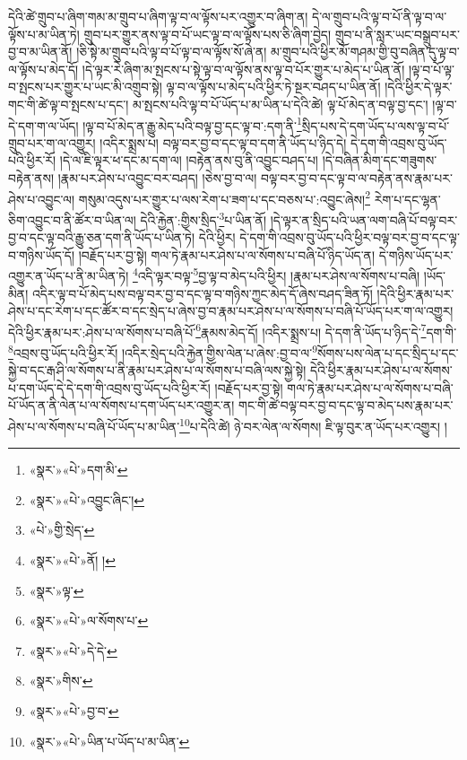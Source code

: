 དེའི་ཚེ་གྲུབ་པ་ཞིག་གམ་མ་གྲུབ་པ་ཞིག་ལྟ་བ་ལ་ལྟོས་པར་འགྱུར་བ་ཞིག་ན། དེ་ལ་གྲུབ་པའི་ལྟ་བ་པོ་ནི་ལྟ་བ་ལ་ལྟོས་པ་མ་ཡིན་ཏེ། གྲུབ་པར་གྱུར་ནས་ལྟ་བ་པོ་ཡང་ལྟ་བ་ལ་ལྟོས་པས་ཅི་ཞིག་བྱེད། གྲུབ་པ་ནི་སླར་ཡང་བསྒྲུབ་པར་བྱ་བ་མ་ཡིན་ནོ། །ཅི་སྟེ་མ་གྲུབ་པའི་ལྟ་བ་པོ་ལྟ་བ་ལ་ལྟོས་སོ་ཞེ་ན། མ་གྲུབ་པའི་ཕྱིར་མོ་གཤམ་གྱི་བུ་བཞིན་དུ་ལྟ་བ་ལ་ལྟོས་པ་མེད་དོ། །དེ་ལྟར་རེ་ཞིག་མ་སྤངས་པ་སྟེ་ལྟ་བ་ལ་ལྟོས་ནས་ལྟ་བ་པོར་གྱུར་པ་མེད་པ་ཡིན་ནོ། །ལྟ་བ་པོ་ལྟ་བ་སྤངས་པར་གྱུར་པ་ཡང་མི་འགྲུབ་སྟེ། ལྟ་བ་ལ་ལྟོས་པ་མེད་པའི་ཕྱིར་ཏེ་སྔར་བཤད་པ་ཡིན་ནོ། །དེའི་ཕྱིར་དེ་ལྟར་གང་གི་ཚེ་ལྟ་བ་སྤངས་པ་དང་། མ་སྤངས་པའི་ལྟ་བ་པོ་ཡོད་པ་མ་ཡིན་པ་དེའི་ཚེ། ལྟ་པོ་མེད་ན་བལྟ་བྱ་དང་། །ལྟ་བ་དེ་དག་ག་ལ་ཡོད། །ལྟ་བ་པོ་མེད་ན་རྒྱུ་མེད་པའི་བལྟ་བྱ་དང་ལྟ་བ་:དག་ནི་\footnote{«སྣར་»«པེ་»དག་མི་}སྲིད་པས་དེ་དག་ཡོད་པ་ལས་ལྟ་བ་པོ་གྲུབ་པར་ག་ལ་འགྱུར། །འདིར་སྨྲས་པ། བལྟ་བར་བྱ་བ་དང་ལྟ་བ་དག་ནི་ཡོད་པ་ཉིད་དེ། དེ་དག་གི་འབྲས་བུ་ཡོད་པའི་ཕྱིར་རོ། །དེ་ལ་ཇི་ལྟར་ཕ་དང་མ་དག་ལ། །བརྟེན་ནས་བུ་ནི་འབྱུང་བཤད་པ། །དེ་བཞིན་མིག་དང་གཟུགས་བརྟེན་ནས། །རྣམ་པར་ཤེས་པ་འབྱུང་བར་བཤད། །ཅེས་བྱ་བ་ལ། བལྟ་བར་བྱ་བ་དང་ལྟ་བ་ལ་བརྟེན་ནས་རྣམ་པར་ཤེས་པ་འབྱུང་ལ། གསུམ་འདུས་པར་གྱུར་པ་ལས་རེག་པ་ཟག་པ་དང་བཅས་པ་:འབྱུང་ཞེས།\footnote{«སྣར་»«པེ་»འབྱུང་ཞིང་།} རེག་པ་དང་ལྷན་ཅིག་འབྱུང་བ་ནི་ཚོར་བ་ཡིན་ལ། དེའི་རྐྱེན་:གྱིས་སྲིད་\footnote{«པེ་»གྱི་སྲེད་}པ་ཡིན་ནོ། །དེ་ལྟར་ན་སྲིད་པའི་ཡན་ལག་བཞི་པོ་བལྟ་བར་བྱ་བ་དང་ལྟ་བའི་རྒྱུ་ཅན་དག་ནི་ཡོད་པ་ཡིན་ཏེ། དེའི་ཕྱིར། དེ་དག་གི་འབྲས་བུ་ཡོད་པའི་ཕྱིར་བལྟ་བར་བྱ་བ་དང་ལྟ་བ་གཉིས་ཡོད་དོ། །བརྗོད་པར་བྱ་སྟེ། གལ་ཏེ་རྣམ་པར་ཤེས་པ་ལ་སོགས་པ་བཞི་པོ་ཉིད་ཡོད་ན། དེ་གཉིས་ཡོད་པར་འགྱུར་ན་ཡོད་པ་ནི་མ་ཡིན་ཏེ། \footnote{«སྣར་»«པེ་»ནོ། ། }འདི་ལྟར་བལྟ་\footnote{«སྣར་»ལྟ་}བྱ་ལྟ་བ་མེད་པའི་ཕྱིར། །རྣམ་པར་ཤེས་ལ་སོགས་པ་བཞི། །ཡོད་མིན། འདིར་ལྟ་བ་པོ་མེད་པས་བལྟ་བར་བྱ་བ་དང་ལྟ་བ་གཉིས་ཀྱང་མེད་དོ་ཞེས་བཤད་ཟིན་ཏོ། །དེའི་ཕྱིར་རྣམ་པར་ཤེས་པ་དང་རེག་པ་དང་ཚོར་བ་དང་སྲེད་པ་ཞེས་བྱ་བ་རྣམ་པར་ཤེས་པ་ལ་སོགས་པ་བཞི་པོ་ཡོད་པར་ག་ལ་འགྱུར། དེའི་ཕྱིར་རྣམ་པར་:ཤེས་པ་ལ་སོགས་པ་བཞི་པོ་\footnote{«སྣར་»«པེ་»ལ་སོགས་པ་}རྣམས་མེད་དོ། །འདིར་སྨྲས་པ། དེ་དག་ནི་ཡོད་པ་ཉིད་དེ་\footnote{«སྣར་»«པེ་»དེ་དེ་}དག་གི་\footnote{«སྣར་»གིས་}འབྲས་བུ་ཡོད་པའི་ཕྱིར་རོ། །འདིར་སྲེད་པའི་རྐྱེན་གྱིས་ལེན་པ་ཞེས་:བྱ་བ་ལ་\footnote{«སྣར་»«པེ་»བྱ་བ་}སོགས་པས་ལེན་པ་དང་སྲིད་པ་དང་སྐྱེ་བ་དང་རྒ་ཤི་ལ་སོགས་པ་ནི་རྣམ་པར་ཤེས་པ་ལ་སོགས་པ་བཞི་ལས་སྐྱེ་སྟེ། དེའི་ཕྱིར་རྣམ་པར་ཤེས་པ་ལ་སོགས་པ་དག་ཡོད་དེ་དེ་དག་གི་འབྲས་བུ་ཡོད་པའི་ཕྱིར་རོ། །བརྗོད་པར་བྱ་སྟེ། གལ་ཏེ་རྣམ་པར་ཤེས་པ་ལ་སོགས་པ་བཞི་པོ་ཡོད་ན་ནི་ལེན་པ་ལ་སོགས་པ་དག་ཡོད་པར་འགྱུར་ན། གང་གི་ཚེ་བལྟ་བར་བྱ་བ་དང་ལྟ་བ་མེད་པས་རྣམ་པར་ཤེས་པ་ལ་སོགས་པ་བཞི་པོ་ཡོད་པ་མ་ཡིན་\footnote{«སྣར་»«པེ་»ཡིན་པ་ཡོད་པ་མ་ཡིན་}པ་དེའི་ཚེ། ཉེ་བར་ལེན་ལ་སོགས། ཇི་ལྟ་བུར་ན་ཡོད་པར་འགྱུར། །
